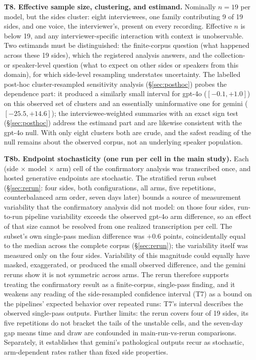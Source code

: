 \documentclass[11pt]{article}
\begin{document}
\textbf{T8. Effective sample size, clustering, and estimand.} Nominally $n = 19$ per model, but the sides cluster: eight interviewees, one family contributing 9 of 19 sides, and one voice, the interviewer's, present on every recording. Effective $n$ is below 19, and any interviewer-specific interaction with context is unobservable. Two estimands must be distinguished: the finite-corpus question (what happened across these 19 sides), which the registered analysis answers, and the collection- or speaker-level question (what to expect on other sides or speakers from this domain), for which side-level resampling understates uncertainty. The labelled post-hoc cluster-resampled sensitivity analysis (\S\ref{sec:posthoc}) probes the dependence part: it produced a similarly small interval for gpt-4o ($[-0.1, +1.0]$) on this observed set of clusters and an essentially uninformative one for gemini ($[-25.5, +14.6]$); the interviewee-weighted summaries with an exact sign test (\S\ref{sec:posthoc}) address the estimand part and are likewise consistent with the gpt-4o null. With only eight clusters both are crude, and the safest reading of the null remains about the observed corpus, not an underlying speaker population.

\textbf{T8b. Endpoint stochasticity (one run per cell in the main study).} Each (side $\times$ model $\times$ arm) cell of the confirmatory analysis was transcribed once, and hosted generative endpoints are stochastic. The stratified rerun subset (\S\ref{sec:rerun}: four sides, both configurations, all arms, five repetitions, counterbalanced arm order, seven days later) bounds a source of measurement variability that the confirmatory analysis did not model: on those four sides, run-to-run pipeline variability exceeds the observed gpt-4o arm difference, so an effect of that size cannot be resolved from one realized transcription per cell. The subset's own single-pass median difference was $+0.6$ points, coincidentally equal to the median across the complete corpus (\S\ref{sec:rerun}); the variability itself was measured only on the four sides. Variability of this magnitude could equally have masked, exaggerated, or produced the small observed difference, and the gemini reruns show it is not symmetric across arms. The rerun therefore supports treating the confirmatory result as a finite-corpus, single-pass finding, and it weakens any reading of the side-resampled confidence interval (T7) as a bound on the pipelines' expected behavior over repeated runs: T7's interval describes the observed single-pass outputs. Further limits: the rerun covers four of 19 sides, its five repetitions do not bracket the tails of the unstable cells, and the seven-day gap means time and draw are confounded in main-run-vs-rerun comparisons. Separately, it establishes that gemini's pathological outputs recur as stochastic, arm-dependent rates rather than fixed side properties.
\end{document}

